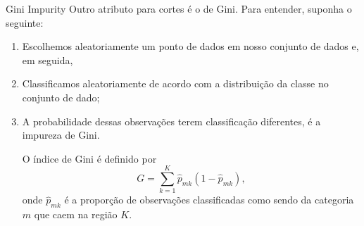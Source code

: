 \documentclass{beamer}
\begin{document}
\begin{frame}{Gini Impurity}
Outro atributo para cortes é o de Gini. Para entender, suponha o seguinte:
\begin{enumerate}
    \item Escolhemos aleatoriamente um ponto de dados em nosso conjunto de dados e, em seguida,
    \item Classificamos aleatoriamente de acordo com a distribuição da classe no conjunto de dado;
    \item A probabilidade dessas observações terem classificação diferentes, é a impureza de Gini.
    
    O índice de Gini é definido por
    \begin{equation}
        G = \sum_{k=1}^K \hat{p}_{mk}(1-\hat{p}_{mk}),
    \end{equation}
    onde $\hat{p}_{mk}$ é a proporção de observações classificadas como sendo da categoria $m$ que caem na região $K$. 
\end{enumerate}
    
\end{frame}
\end{document}
